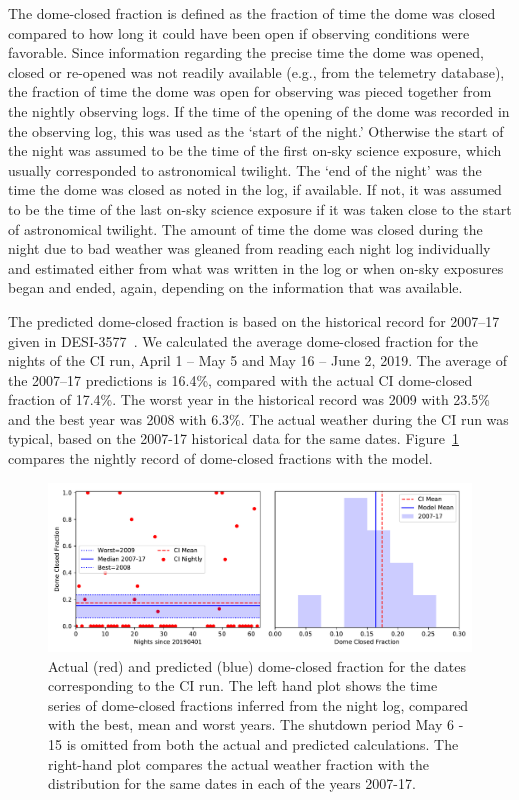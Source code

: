 \documentclass[12pt]{article}
\providecommand{\fig}[1]{Figure~\ref{fig:#1}}
\begin{document}
The dome-closed fraction is defined as the fraction of time the dome was closed compared to how long it could have
been open if  observing conditions were favorable. Since information regarding the precise time the dome was opened,
closed or re-opened was not readily available (e.g., from the telemetry database), the fraction of time the dome was
open for observing was pieced together
from the nightly observing logs. If the time of the opening of the dome was recorded in the observing log, this was
used as the `start of the night.' Otherwise the start of the night was assumed to be the time of the first on-sky
science exposure, which usually corresponded to astronomical twilight. The `end of the night' was the time the dome
was closed as noted in the log, if available. If not, it was assumed to be the time of the last on-sky science
exposure if it was taken close to the start of astronomical twilight. The amount of time the dome was closed during
the night due to bad weather was gleaned from reading each night log individually and estimated either from what was
written in the log or when on-sky exposures began and ended, again, depending on the information that was available. 

The predicted dome-closed fraction is based on the historical record for 2007--17 given in DESI-3577~\cite{desi-3577}.
We calculated the average dome-closed fraction for the nights of the CI run, April 1 -- May 5 and May 16 -- June 2, 2019.
The average of the 2007--17 predictions is 16.4\%, compared with the actual CI dome-closed fraction of 17.4\%.  The worst
year in the historical record was 2009 with 23.5\% and the best year was 2008 with 6.3\%.  The actual weather during the
CI run was typical, based on the 2007-17 historical data for the same dates.  \fig{CIdome} compares the nightly
record of dome-closed fractions with the model.

\begin{figure}[htb]
\begin{center}
\includegraphics[width=6in]{CIdome}
\caption{Actual (red) and predicted (blue) dome-closed fraction for the dates corresponding to the CI run. The left hand plot
shows the time series of dome-closed fractions inferred from the night log, compared with the best, mean and worst years. The
shutdown period May 6 - 15 is omitted from both the actual and predicted calculations. The right-hand plot compares the actual
weather fraction with the distribution for the same dates in each of the years 2007-17.}
\label{fig:CIdome}
\end{center}
\end{figure}
\end{document}
